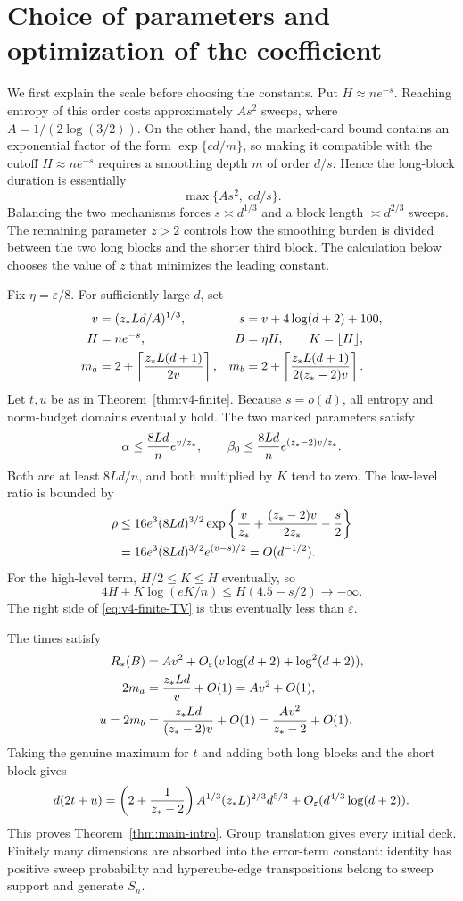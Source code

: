 \documentclass[11pt]{article}
\numberwithin{equation}{section}
\theoremstyle{definition}\newtheorem{definition}[theorem]{Definition}
\theoremstyle{remark}\newtheorem{remark}[theorem]{Remark}
\begin{document}
\section{Choice of parameters and optimization of the coefficient}
We first explain the scale before choosing the constants.  Put
$H\approx ne^{-s}$.  Reaching entropy of this order costs
approximately $As^2$ sweeps, where $A=1/(2\log(3/2))$.  On the other hand,
the marked-card bound contains an exponential factor of the form
$\exp\{c d/m\}$, so making it compatible with the cutoff $H\approx ne^{-s}$
requires a smoothing depth $m$ of order $d/s$.  Hence the long-block duration
is essentially
\[
 \max\{As^2,\;c d/s\}.
\]
Balancing the two mechanisms forces $s\asymp d^{1/3}$ and a block length
$\asymp d^{2/3}$ sweeps.  The remaining parameter $z>2$ controls how the
smoothing burden is divided between the two long blocks and the shorter third
block.  The calculation below chooses the value of $z$ that minimizes the
leading constant.

Fix $\eta=\varepsilon/8$. For sufficiently large $d$, set
\begin{align}
 v&=(z_*Ld/A)^{1/3},&
 s&=v+4\log(d+2)+100,\nonumber\\
 H&=ne^{-s},&B&=\eta H,\qquad K=\lfloor H\rfloor,\nonumber\\
 m_a&=2+\left\lceil{z_*L(d+1)\over2v}\right\rceil,&
 m_b&=2+\left\lceil{z_*L(d+1)\over2(z_*-2)v}\right\rceil.
 \label{eq:v4-parameters}
\end{align}
Let $t,u$ be as in Theorem~\ref{thm:v4-finite}. Because $s=o(d)$, all
entropy and norm-budget domains eventually hold. The two marked parameters
satisfy
\[
 \alpha\le{8Ld\over n}e^{v/z_*},\qquad
 \beta_0\le{8Ld\over n}e^{(z_*-2)v/z_*}.
\]
Both are at least $8Ld/n$, and both multiplied by $K$ tend to zero.
The low-level ratio is bounded by
\begin{align*}
 \rho&\le16e^3(8Ld)^{3/2}
  \exp\left\{{v\over z_*}+{(z_*-2)v\over2z_*}-{s\over2}\right\}\\
 &=16e^3(8Ld)^{3/2}e^{(v-s)/2}=O(d^{-1/2}).
\end{align*}
For the high-level term, $H/2\le K\le H$ eventually, so
\[
 4H+K\log(eK/n)\le H(4.5-s/2)\longrightarrow-\infty.
\]
The right side of \eqref{eq:v4-finite-TV} is thus eventually less than
$\varepsilon$.

The times satisfy
\begin{align*}
 R_*(B)&=Av^2+O_\varepsilon(v\log(d+2)+\log^2(d+2)),\\
 2m_a&={z_*Ld\over v}+O(1)=Av^2+O(1),\\
 u=2m_b&={z_*Ld\over(z_*-2)v}+O(1)
                          ={Av^2\over z_*-2}+O(1).
\end{align*}
Taking the genuine maximum for $t$ and adding both long blocks and the
short block gives
\[
 d(2t+u)=\left(2+{1\over z_*-2}\right)
   A^{1/3}(z_*L)^{2/3}d^{5/3}
                  +O_\varepsilon(d^{4/3}\log(d+2)).
\]
This proves Theorem~\ref{thm:main-intro}. Group translation gives every
initial deck. Finitely many dimensions are absorbed into the error-term
constant: identity has positive sweep probability and hypercube-edge
transpositions belong to sweep support and generate $S_n$.
\end{document}
